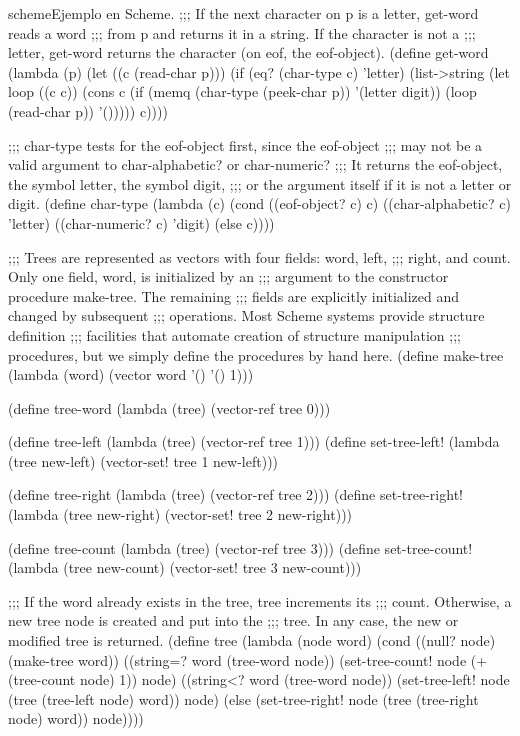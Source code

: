\begin{sourcecode}{scheme}{Ejemplo en Scheme.}
;;; If the next character on p is a letter, get-word reads a word
;;; from p and returns it in a string.  If the character is not a
;;; letter, get-word returns the character (on eof, the eof-object).
(define get-word
	(lambda (p)
	(let ((c (read-char p)))
		(if (eq? (char-type c) 'letter)
			(list->string
			(let loop ((c c))
				(cons c
				(if (memq (char-type (peek-char p)) '(letter digit))
					(loop (read-char p))
					'()))))
			c))))

;;; char-type tests for the eof-object first, since the eof-object
;;; may not be a valid argument to char-alphabetic? or char-numeric?
;;; It returns the eof-object, the symbol letter, the symbol digit,
;;; or the argument itself if it is not a letter or digit.
(define char-type
	(lambda (c)
	(cond
		((eof-object? c) c)
		((char-alphabetic? c) 'letter)
		((char-numeric? c) 'digit)
		(else c))))

;;; Trees are represented as vectors with four fields: word, left,
;;; right, and count.  Only one field, word, is initialized by an
;;; argument to the constructor procedure make-tree.  The remaining
;;; fields are explicitly initialized and changed by subsequent
;;; operations.  Most Scheme systems provide structure definition
;;; facilities that automate creation of structure manipulation
;;; procedures, but we simply define the procedures by hand here.
(define make-tree
	(lambda (word)
	(vector word '() '() 1)))

(define tree-word (lambda (tree) (vector-ref tree 0)))

(define tree-left (lambda (tree) (vector-ref tree 1)))
(define set-tree-left!
	(lambda (tree new-left)
	(vector-set! tree 1 new-left)))

(define tree-right (lambda (tree) (vector-ref tree 2)))
(define set-tree-right!
	(lambda (tree new-right)
	(vector-set! tree 2 new-right)))

(define tree-count (lambda (tree) (vector-ref tree 3)))
(define set-tree-count!
	(lambda (tree new-count)
	(vector-set! tree 3 new-count)))

;;; If the word already exists in the tree, tree increments its
;;; count.  Otherwise, a new tree node is created and put into the
;;; tree.  In any case, the new or modified tree is returned.
(define tree
	(lambda (node word)
	(cond
		((null? node) (make-tree word))
		((string=? word (tree-word node))
		(set-tree-count! node (+ (tree-count node) 1))
		node)
		((string<? word (tree-word node))
		(set-tree-left! node (tree (tree-left node) word))
		node)
		(else
		(set-tree-right! node (tree (tree-right node) word))
		node))))


\end{sourcecode}
